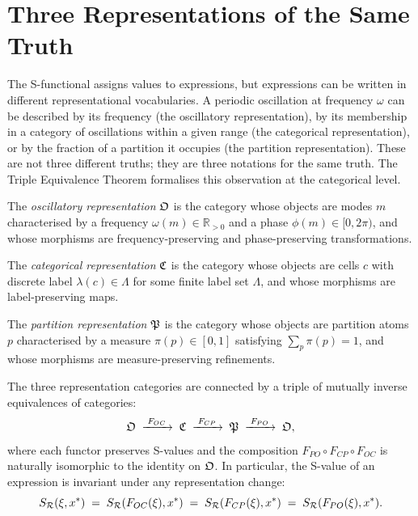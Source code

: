 \section{Three Representations of the Same Truth}
\label{sec:triple-equivalence}

The S-functional assigns values to expressions, but expressions can be written in different representational vocabularies. A periodic oscillation at frequency $\omega$ can be described by its frequency (the oscillatory representation), by its membership in a category of oscillations within a given range (the categorical representation), or by the fraction of a partition it occupies (the partition representation). These are not three different truths; they are three notations for the same truth. The Triple Equivalence Theorem formalises this observation at the categorical level.

\begin{definition}\label{def:osc-rep}
The \emph{oscillatory representation} $\mathfrak{O}$ is the category whose objects are modes $m$ characterised by a frequency $\omega(m) \in \mathbb{R}_{>0}$ and a phase $\phi(m) \in [0, 2\pi)$, and whose morphisms are frequency-preserving and phase-preserving transformations.
\end{definition}

\begin{definition}\label{def:cat-rep}
The \emph{categorical representation} $\mathfrak{C}$ is the category whose objects are cells $c$ with discrete label $\lambda(c) \in \Lambda$ for some finite label set $\Lambda$, and whose morphisms are label-preserving maps.
\end{definition}

\begin{definition}\label{def:part-rep}
The \emph{partition representation} $\mathfrak{P}$ is the category whose objects are partition atoms $p$ characterised by a measure $\pi(p) \in [0, 1]$ satisfying $\sum_p \pi(p) = 1$, and whose morphisms are measure-preserving refinements.
\end{definition}

\begin{theorem}\label{thm:triple-equiv}
The three representation categories are connected by a triple of mutually inverse equivalences of categories:
\[
\mathfrak{O} \;\xrightarrow{\;F_{OC}\;}\; \mathfrak{C} \;\xrightarrow{\;F_{CP}\;}\; \mathfrak{P} \;\xrightarrow{\;F_{PO}\;}\; \mathfrak{O},
\]
where each functor preserves S-values and the composition $F_{PO} \circ F_{CP} \circ F_{OC}$ is naturally isomorphic to the identity on $\mathfrak{O}$. In particular, the S-value of an expression is invariant under any representation change:
\[
S_{\mathcal{R}}(\xi, x^*)
\;=\; S_{\mathcal{R}}(F_{OC}(\xi), x^*)
\;=\; S_{\mathcal{R}}(F_{CP}(\xi), x^*)
\;=\; S_{\mathcal{R}}(F_{PO}(\xi), x^*).
\]
\end{theorem}

